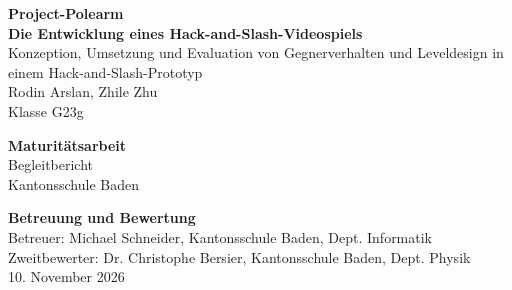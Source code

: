 \documentclass[10pt]{article}
\begin{document}

\begin{titlepage}
    \begin{center}
        \vspace*{2cm}

        \textbf{\Huge{Project-Polearm}} \\ [2em]
        \textbf{\Large Die Entwicklung eines Hack-and-Slash-Videospiels} \\ [0.6em]
        \large{Konzeption, Umsetzung und Evaluation von Gegnerverhalten und Leveldesign in einem Hack-and-Slash-Prototyp} \\ [2em]

        \Large{Rodin Arslan, Zhile Zhu} \\ [0.5em]
        \large{Klasse G23g}

        \vspace{3cm}

        \LARGE{\textbf{Maturitätsarbeit}} \\ [0.3em]
        \Large{Begleitbericht} \\ [0.5em]
        \large{Kantonsschule Baden}

        \vfill

        \Large{\textbf{Betreuung und Bewertung}} \\ [0.5em]
        \large{Betreuer: Michael Schneider, Kantonsschule Baden, Dept. Informatik} \\
        \large{Zweitbewerter: Dr. Christophe Bersier, Kantonsschule Baden, Dept. Physik} \\

        \vspace{2cm}
        \large{10. November 2026}
    \end{center}
\end{titlepage}

\newpage

\end{document}
